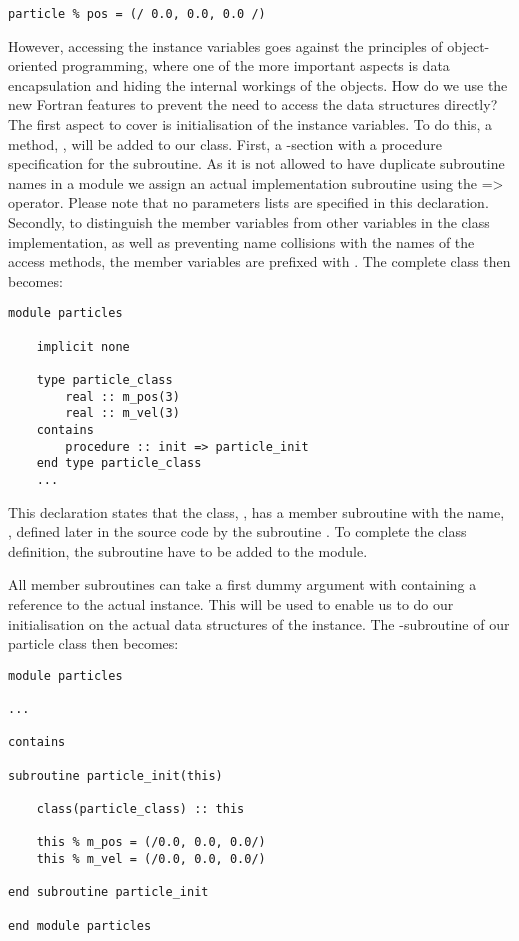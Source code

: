 \begin{lstlisting}
particle % pos = (/ 0.0, 0.0, 0.0 /)
\end{lstlisting}

However, accessing the instance variables goes against the principles of object-oriented programming, where one of the more important aspects is data encapsulation and hiding the internal workings of the objects. How do we use the new Fortran features to prevent the need to access the data structures directly? The first aspect to cover is initialisation of the instance  variables. To do this, a method, , will be added to our class. First, a -section with a procedure specification for the  subroutine. As it is not allowed to have duplicate subroutine names in a module we assign an actual implementation subroutine using the => operator. Please note that no parameters lists are specified in this declaration. Secondly, to distinguish the member variables from other variables in the class implementation, as well as preventing name collisions with the names of the access methods, the member variables are prefixed with . The complete class then becomes:

\begin{lstlisting}
module particles

    implicit none

    type particle_class
        real :: m_pos(3)
        real :: m_vel(3)
    contains
        procedure :: init => particle_init
    end type particle_class
    ...
\end{lstlisting}

This declaration states that the class, , has a member subroutine with the name, , defined later in the source code by the subroutine . To complete the class definition, the subroutine  have to be added to the  module. 

All member subroutines can take a first dummy argument with containing a reference to the actual instance. This will be used to enable us to do our initialisation on the actual data structures of the instance. The -subroutine of our particle class then becomes:

\begin{lstlisting}
module particles

...

contains

subroutine particle_init(this)

    class(particle_class) :: this

    this % m_pos = (/0.0, 0.0, 0.0/)
    this % m_vel = (/0.0, 0.0, 0.0/)

end subroutine particle_init

end module particles
\end{lstlisting}

